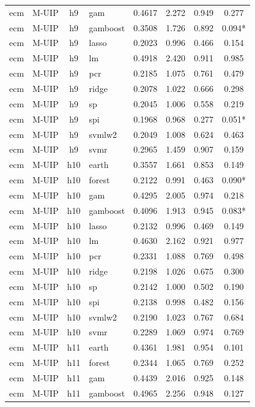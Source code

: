 \begin{ThreePartTable}
\begin{longtable}[t]{llclcccc}
ecm & M-UIP & h9 & gam & 0.4617 & 2.272 & 0.949 & 0.277\\
ecm & M-UIP & h9 & gamboost & 0.3508 & 1.726 & 0.892 & 0.094*\\
ecm & M-UIP & h9 & lasso & 0.2023 & 0.996 & 0.466 & 0.154\\
ecm & M-UIP & h9 & lm & 0.4918 & 2.420 & 0.911 & 0.985\\
ecm & M-UIP & h9 & pcr & 0.2185 & 1.075 & 0.761 & 0.479\\
ecm & M-UIP & h9 & ridge & 0.2078 & 1.022 & 0.666 & 0.298\\
ecm & M-UIP & h9 & sp & 0.2045 & 1.006 & 0.558 & 0.219\\
ecm & M-UIP & h9 & spi & 0.1968 & 0.968 & 0.277 & 0.051*\\
ecm & M-UIP & h9 & svmlw2 & 0.2049 & 1.008 & 0.624 & 0.463\\
ecm & M-UIP & h9 & svmr & 0.2965 & 1.459 & 0.907 & 0.159\\
\addlinespace
ecm & M-UIP & h10 & earth & 0.3557 & 1.661 & 0.853 & 0.149\\
ecm & M-UIP & h10 & forest & 0.2122 & 0.991 & 0.463 & 0.090*\\
ecm & M-UIP & h10 & gam & 0.4295 & 2.005 & 0.974 & 0.218\\
ecm & M-UIP & h10 & gamboost & 0.4096 & 1.913 & 0.945 & 0.083*\\
ecm & M-UIP & h10 & lasso & 0.2132 & 0.996 & 0.469 & 0.149\\
ecm & M-UIP & h10 & lm & 0.4630 & 2.162 & 0.921 & 0.977\\
ecm & M-UIP & h10 & pcr & 0.2331 & 1.088 & 0.769 & 0.498\\
ecm & M-UIP & h10 & ridge & 0.2198 & 1.026 & 0.675 & 0.300\\
ecm & M-UIP & h10 & sp & 0.2142 & 1.000 & 0.502 & 0.190\\
ecm & M-UIP & h10 & spi & 0.2138 & 0.998 & 0.482 & 0.156\\
ecm & M-UIP & h10 & svmlw2 & 0.2190 & 1.023 & 0.767 & 0.684\\
ecm & M-UIP & h10 & svmr & 0.2289 & 1.069 & 0.974 & 0.769\\
\addlinespace
ecm & M-UIP & h11 & earth & 0.4361 & 1.981 & 0.954 & 0.101\\
ecm & M-UIP & h11 & forest & 0.2344 & 1.065 & 0.769 & 0.252\\
ecm & M-UIP & h11 & gam & 0.4439 & 2.016 & 0.925 & 0.148\\
ecm & M-UIP & h11 & gamboost & 0.4965 & 2.256 & 0.948 & 0.127\\

\end{longtable}
\end{ThreePartTable}
